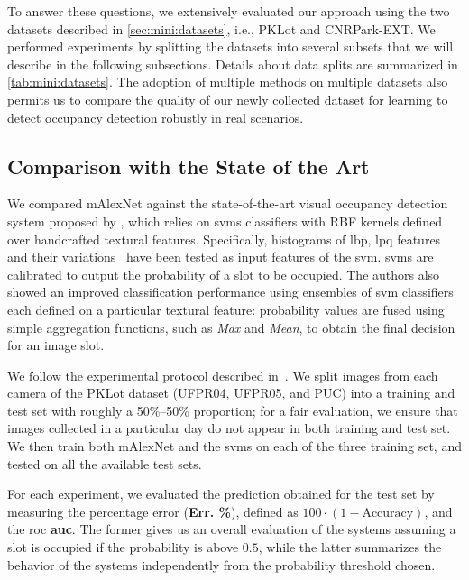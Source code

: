 To answer these questions, we extensively evaluated our approach using the two datasets described in \ref{sec:mini:datasets}, i.e., PKLot and CNRPark-EXT.
We performed experiments by splitting the datasets into several subsets that we will describe in the following subsections.
Details about data splits are summarized in \ref{tab:mini:datasets}.
The adoption of multiple methods on multiple datasets also permits us to compare the quality of our newly collected dataset for learning to detect occupancy detection robustly in real scenarios.

\subsection{Comparison with the State of the Art}
\label{sub:mini:sota}

We compared mAlexNet against the state-of-the-art visual occupancy detection system proposed by \citet{de2015pklot}, which relies on \glspl{svm} classifiers with RBF kernels defined over handcrafted textural features.
Specifically, histograms of \gls{lbp}, \gls{lpq} features and their variations~\cite{ojala2002multiresolution, ojansivu2008blur, rahtu2012local} have been tested as input features of the \gls{svm}.
\Glspl{svm} are calibrated to output the probability of a slot to be occupied.
The authors also showed an improved classification performance  using ensembles of \gls{svm} classifiers each defined on a particular textural feature:
probability values are fused using simple aggregation functions, such as \emph{Max} and \emph{Mean}, to obtain the final decision for an image slot.

We follow the experimental protocol described in~\cite{de2015pklot}.
We split images from each camera of the PKLot dataset (UFPR04, UFPR05, and PUC) into a training and test set with roughly a 50\%--50\% proportion;
for a fair evaluation, we ensure that images collected in a particular day do not appear in both training and test set.
We then train both mAlexNet and the \glspl{svm} on each of the three training set, and tested on all the available test sets.
%

For each experiment, we evaluated the prediction obtained for the test set by measuring the percentage error (\textbf{Err. \%}), defined as $100 \cdot (1 - \text{Accuracy})$, and the \gls{roc} \textbf{\gls{auc}}.
The former gives us an overall evaluation of the systems assuming a slot is occupied if the probability is above $0.5$, while the latter summarizes the behavior of the systems independently from the probability threshold chosen.


